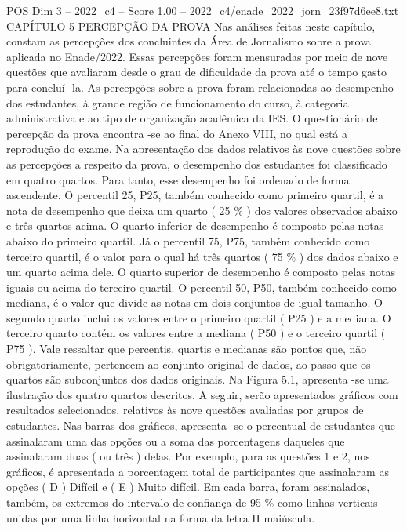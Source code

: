 \begin{textsample}{POS Dim 3 – 2022\_c4 – Score 1.00 – 2022\_c4/enade\_2022\_jorn\_23f97d6ee8.txt}  \label{ex:f3_pos_174}
CAPÍTULO 5 PERCEPÇÃO DA PROVA Nas análises feitas neste capítulo, constam as percepções dos concluintes da Área de Jornalismo sobre a prova aplicada no Enade/2022.
Essas percepções foram mensuradas por meio de nove questões que avaliaram desde o grau de dificuldade da prova até o tempo gasto para concluí -la.
As percepções sobre a prova foram relacionadas ao desempenho dos estudantes, à grande região de funcionamento do curso, à categoria administrativa e ao tipo de organização acadêmica da IES.
O questionário de percepção da prova encontra -se ao final do Anexo VIII, no qual está a reprodução do exame.
Na apresentação dos dados relativos às nove questões sobre as percepções a respeito da prova, o desempenho dos estudantes foi classificado em quatro quartos.
Para tanto, esse desempenho foi ordenado de forma ascendente.
O percentil 25, P25, também conhecido como primeiro quartil, é a nota de desempenho que deixa um quarto ( 25 \% ) dos valores observados abaixo e três quartos acima.
O quarto inferior de desempenho é composto pelas notas abaixo do primeiro quartil.
Já o percentil 75, P75, também conhecido como terceiro quartil, é o valor para o qual há três quartos ( 75 \% ) dos dados abaixo e um quarto acima dele.
O quarto superior de desempenho é composto pelas notas iguais ou acima do terceiro quartil.
O percentil 50, P50, também conhecido como mediana, é o valor que divide as notas em dois conjuntos de igual tamanho.
O segundo quarto inclui os valores entre o primeiro quartil ( P25 ) e a mediana.
O terceiro quarto contém os valores entre a mediana ( P50 ) e o terceiro quartil ( P75 ).
Vale ressaltar que percentis, quartis e medianas são pontos que, não obrigatoriamente, pertencem ao conjunto original de dados, ao passo que os quartos são subconjuntos dos dados originais.
Na Figura 5.1, apresenta -se uma ilustração dos quatro quartos descritos.
A seguir, serão apresentados gráficos com resultados selecionados, relativos às nove questões avaliadas por grupos de estudantes.
Nas barras dos gráficos, apresenta -se o percentual de estudantes que assinalaram uma das opções ou a soma das porcentagens daqueles que assinalaram duas ( ou três ) delas.
Por exemplo, para as questões 1 e 2, nos gráficos, é apresentada a porcentagem total de participantes que assinalaram as opções ( D ) Difícil e ( E ) Muito difícil.
Em cada barra, foram assinalados, também, os extremos do intervalo de confiança de 95 \% como linhas verticais unidas por uma linha horizontal na forma da letra H maiúscula.

\end{textsample}
